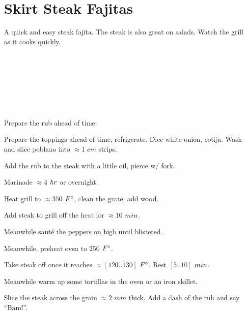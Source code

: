 \section[Steak Fajitas]{Skirt Steak Fajitas}


\begin{recipestats}[
	servings=4,
	preptime=30~\minute,
	bakingtime=15~\minute,
	inactivetime=4~\hour,
	source=Mike \& Jane,
]
\end{recipestats}


\begin{recipeabstract}
	A quick and easy steak fajita.
	The steak is also great on salads.
	Watch the grill as it cooks quickly.
\end{recipeabstract}


\begin{ingredientcolumns}[1]
	\begin{ingredientblock}
		\\
		\\
		\\
		\\
		\\
		\\
	\end{ingredientblock}
\end{ingredientcolumns}


\begin{preparation}
\item Prepare the rub ahead of time.
\item Prepare the toppings ahead of time, refrigerate.
	Dice white onion, cotija.
	Wash and slice poblano into $\approx 1$ $cm$ strips.
\item Add the rub to the steak with a little oil, pierce w/ fork.
\item Marinade $\approx 4$ $\hour$ or overnight.
\item Heat grill to $\approx 350$ $\Fahrenheit$, clean the grate, add wood.
\item Add steak to grill off the heat for $\approx 10$ $\minute$.
\item Meanwhile saut\'{e} the peppers on high until blistered.
\item Meanwhile, preheat oven to 250 $\Fahrenheit$.
\item Take steak off once it reaches $\approx [120 .. 130]$ $\Fahrenheit$.
	Rest $[5..10]$ $\minute$.
\item Meanwhile warm up some tortillas in the oven or an iron skillet.
\item Slice the steak across the grain $\approx 2$ $mm$ thick.
	Add a dash of the rub and say ``Bam!''.
\end{preparation}


\recipeend%
